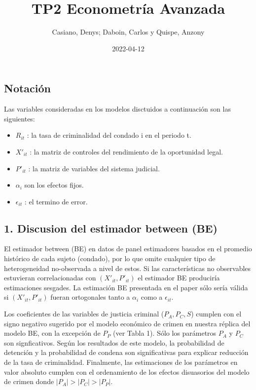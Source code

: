 \documentclass[
]{article}
\title{TP2 Econometría Avanzada}
\author{Casiano, Denys; Daboin, Carlos y Quispe, Anzony}
\date{2022-04-12}
\providecommand{\tightlist}{%
  \setlength{\itemsep}{0pt}\setlength{\parskip}{0pt}}
\begin{document}
\maketitle

\hypertarget{notaciuxf3n}{%
\subsection{Notación}\label{notaciuxf3n}}

Las variables consideradas en los modelos disctuidos a continuación son
las siguientes:

\begin{itemize}
\tightlist
\item
  \(R_{it}\) : la tasa de criminalidad del condado i en el periodo t.
\item
  \(X'_{it}\) : la matriz de controles del rendimiento de la oportunidad
  legal.
\item
  \(P'_{it}\) : la matriz de variables del sistema judicial.
\item
  \(\alpha_{i}\) son los efectos fijos.
\item
  \(\epsilon_{it}\) : el termino de error.
\end{itemize}

\hypertarget{discusion-del-estimador-between-be}{%
\subsection{1. Discusion del estimador between
(BE)}\label{discusion-del-estimador-between-be}}

El estimador between (BE) en datos de panel estimadores basados en el
promedio histórico de cada sujeto (condado), por lo que omite cualquier
tipo de heterogeneidad no-observada a nivel de estos. Si las
características no observables estuvieran correlacionadas con
\((X'_{it},P'_{it})\) el estimador BE produciría estimaciones sesgades.
La estimación BE presentada en el paper sólo sería válida si
\((X'_{it},P'_{it})\) fueran ortogonales tanto a \(\alpha_i\) como a
\(\epsilon_{it}\).

Los coeficientes de las variables de justicia criminal (\(P_A, P_C, S\))
cumplen con el signo negativo sugerido por el modelo económico de crimen
en nuestra réplica del modelo BE, con la excepción de \(P_P\) (ver Tabla
1). Sólo los parámetros \(P_A\) y \(P_C\) son signficativos. Según los
resultados de este modelo, la probabilidad de detención y la
probabilidad de condena son significativas para explicar reducción de la
tasa de criminalidad. Finalmente, las estimaciones de los parámetros en
valor absoluto cumplen con el ordenamiento de los efectos disuasorios
del modelo de crimen donde \(|P_A|>|P_C|>|P_P|\).
\end{document}
